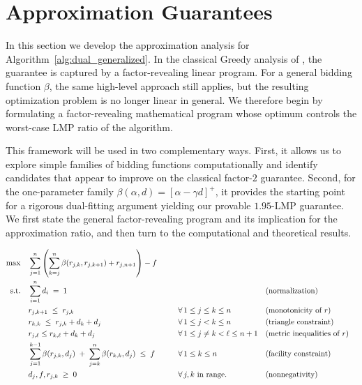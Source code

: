 \section{Approximation Guarantees}
\label{sec:approx_guarantee}
In this section we develop the approximation analysis for Algorithm~\ref{alg:dual_generalized}. In the classical Greedy analysis of \cite{JMS02,JainMMSV03}, the guarantee is captured by a factor-revealing linear program. For a general bidding function $\beta$, the same high-level approach still applies, but the resulting optimization problem is no longer linear in general. We therefore begin by formulating a factor-revealing mathematical program whose optimum controls the worst-case LMP ratio of the algorithm.

This framework will be used in two complementary ways. First, it allows us to explore simple families of bidding functions computationally and identify candidates that appear to improve on the classical factor-$2$ guarantee. Second, for the one-parameter family $\beta(\alpha,d)=[\alpha-\gamma d]^+$, it provides the starting point for a rigorous dual-fitting argument yielding our provable $1.95$-LMP guarantee. We first state the general factor-revealing program and its implication for the approximation ratio, and then turn to the computational and theoretical results.

\begin{definition}
\label{def:frp}
\begin{align}
\max \quad & \sum_{j=1}^n \left(\sum_{k=j}^{n} \beta(r_{j,k}, r_{j,k+1}) + r_{j,n+1}\right) - f
\label{eq:fr-obj}
\\
\text{s.t.}\quad 
& \sum_{i=1}^{n} d_i \;=\; 1
\qquad && && \text{(normalization)}
\label{eq:fr-norm}
\\
& r_{j,k+1} \;\le\; r_{j,k}
\qquad && \forall\, 1\le j \leq k \leq n && \text{(monotonicity of $r$)}
\label{eq:fr-r-mono}
\\
& r_{k,k} \;\le\; r_{j,k} + d_k + d_j
\qquad && \forall\, 1\le j<k\le n && \text{(triangle constraint)}
\label{eq:fr-triangle}
\\
& r_{j, \ell} \leq r_{k, \ell} + d_k + d_j && \forall\, 1 \leq j \neq k < \ell \leq n + 1 && \text{(metric inequalities of $r$)}
\label{eq:fr-r-metric}
\\
& \sum_{j=1}^{k-1} \beta(r_{j,k},d_j)
  \;+\;
  \sum_{j=k}^{n} \beta(r_{k,k},d_j)
  \;\le\; f
\qquad && \forall\, 1\le k\le n && \text{(facility constraint)}
\label{eq:fr-facility}
\\
& d_j, f, r_{j,k} \;\ge\; 0
\qquad && \forall\, j,k \text{ in range.} && \text{(nonnegativity)}
\label{eq:fr-nonneg}
\end{align}
\end{definition}

